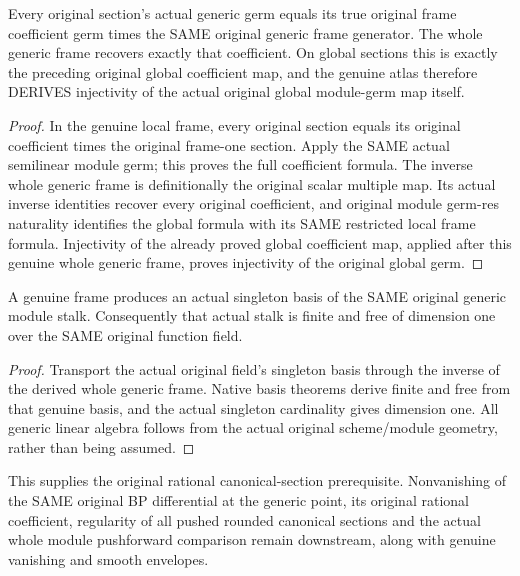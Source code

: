 \begin{theorem}
\label{sc0-generic-line:whole-germ-coefficient}
\leanok
Every original section's actual generic germ equals its true original
frame coefficient germ times the SAME original generic frame generator.
The whole generic frame recovers exactly that coefficient. On global
sections this is exactly the preceding original global coefficient map,
and the genuine atlas therefore DERIVES injectivity of the actual
original global module-germ map itself.
\end{theorem}
\begin{proof}
In the genuine local frame, every original section equals its original
coefficient times the original frame-one section. Apply the SAME actual
semilinear module germ; this proves the full coefficient formula. The
inverse whole generic frame is definitionally the original scalar
multiple map. Its actual inverse identities recover every original
coefficient, and original module germ-res naturality identifies the
global formula with its SAME restricted local frame formula. Injectivity
of the already proved global coefficient map, applied after this genuine
whole generic frame, proves injectivity of the original global germ.
\end{proof}

\begin{theorem}
\label{sc0-generic-line:actual-rank-one}
\leanok
A genuine frame produces an actual singleton basis of the SAME original
generic module stalk. Consequently that actual stalk is finite and
free of dimension one over the SAME original function field.
\end{theorem}
\begin{proof}
Transport the actual original field's singleton basis through the inverse
of the derived whole generic frame. Native basis theorems derive finite
and free from that genuine basis, and the actual singleton cardinality
gives dimension one. All generic linear algebra follows from the actual
original scheme/module geometry, rather than being assumed.
\end{proof}

This supplies the original rational canonical-section prerequisite.
Nonvanishing of the SAME original BP differential at the generic point,
its original rational coefficient, regularity of all pushed rounded
canonical sections and the actual whole module pushforward comparison
remain downstream, along with genuine vanishing and smooth envelopes.
